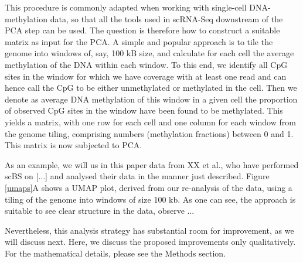 \documentclass[twocolumn,10pt]{article}
\begin{document}
This procedure is commonly adapted when working with single-cell DNA-methylation data, so that all the tools used in scRNA-Seq downstream of the PCA step can be used. The question is therefore how to construct a suitable matrix as input for the PCA. A simple and popular approach is to tile the genome into windows of, say, 100 kB size, and calculate for each cell the average methylation of the DNA within each window. To this end, we identify all CpG sites in the window for which we have coverage with at least one read and can hence call the CpG to be either unmethylated or methylated in the cell. Then we denote as average DNA methylation of this window in a given cell the proportion of observed CpG sites in the window have been found to be methylated. This yields a matrix, with one row for each cell and one column for each window from the genome tiling, comprising numbers (methylation fractions) between 0 and 1. This matrix is now subjected to PCA.

As an example, we will us in this paper data from XX et al., who have performed scBS on [...] and analysed their data in the manner just described. Figure \ref{umaps}A shows a UMAP plot, derived from our re-analysis of the data, using a tiling of the genome into windows of size 100 kb. As one can see, the approach is suitable to see clear structure in the data, observe ...

Nevertheless, this analysis strategy has substantial room for improvement, as we will discuss next. Here, we discuss the proposed improvements only qualitatively. For the mathematical details, please see the Methods section. 
\end{document}
